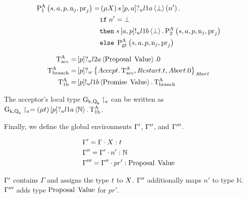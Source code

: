 \begin{align*}
\operatorname{P^{A}_{1}}\left(
s,
a,
p,
\operatorname{n}_{j},
\operatorname{pr}_{j}
\right) =
&
    \left(\mu X\right)
    s\left[p, a\right]?_u l1a \left\langle \bot \right\rangle \left(n'\right).\\
&
    \mathtt{if}\; n'=\bot\\
&
    \mathtt{then}\;
        s\left[a, p\right]!_u l1b \left\langle \bot \right\rangle.
        \operatorname{P^{A}_{2}}\left(
            s,
            a,
            p,
            \operatorname{n}_{j},
            \operatorname{pr}_{j}
        \right)\\
&
    \mathtt{else}\;
        \operatorname{P^{A}_{gt}}\left(
            s,
            a,
            p,
            \operatorname{n}_{j},
            \operatorname{pr}_{j}
        \right)
\end{align*}

\begin{align*}    
\operatorname{T^{A}_{acc}} =& \left[p\right]?_u l2a \left\langle \operatorname{Proposal}\; \operatorname{Value} \right\rangle.0
\\
\operatorname{T^{A}_{branch}} =& \left[p\right]?_w \left\{\mathnormal{Accept} . \operatorname{T^{A}_{acc}} , \mathnormal{Restart} . t , \mathnormal{Abort} .0\right\}_{\mathnormal{Abort}}
\\
\operatorname{T^{A}_{1b}} =& \left[p\right]!_u l1b \left\langle \operatorname{Promise}\; \operatorname{Value} \right\rangle . \operatorname{T^{A}_{branch}}
\end{align*}

The acceptor's local type $\operatorname{G_{k, \operatorname{Q}_{k}}} \upharpoonright_{a}$ can be written as $\operatorname{G_{k, \operatorname{Q}_{k}}} \upharpoonright_{a} = \left(\mu t\right)\left[p\right]?_u l1a \left\langle \mathbb{N} \right\rangle.\operatorname{T^{A}_{1b}}$.

Finally, we define the global environments $\Gamma'$, $\Gamma''$, and $\Gamma'''$.

\begin{align*}
&\Gamma' = \Gamma \cdot X:t\\
&\Gamma'' = \Gamma' \cdot n':\mathbb{N}\\
&\Gamma''' = \Gamma'' \cdot pr':\operatorname{Proposal}\; \operatorname{Value}
\end{align*}

$\Gamma'$ contains $\Gamma$ and assigns the type $t$ to $X$.
$\Gamma''$ additionally maps $n'$ to type $\mathbb{N}$.
$\Gamma'''$ adds type $\operatorname{Proposal}\; \operatorname{Value}$ for $pr'$.

